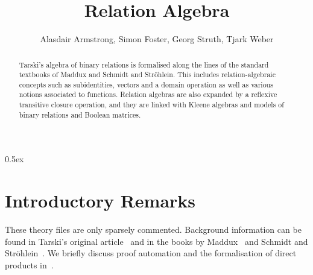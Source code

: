 \documentclass[11pt,a4paper]{article}
\begin{document}
\title{Relation Algebra}
\author{Alasdair Armstrong, Simon Foster, Georg Struth, Tjark Weber}
\maketitle

\begin{abstract}
Tarski's algebra of binary relations is formalised along the lines of
the standard textbooks of Maddux and Schmidt and Str\"ohlein. This
includes relation-algebraic concepts such as subidentities, vectors
and a domain operation as well as various notions associated to
functions. Relation algebras are also expanded by a reflexive
transitive closure operation, and they are linked with Kleene algebras
and models of binary relations and Boolean matrices.
\end{abstract}

\tableofcontents

\parindent 0pt\parskip 0.5ex

\section{Introductory Remarks}

These theory files are only sparsely commented. Background information
can be found in Tarski's original article~\cite{tarski41} and in the
books by Maddux~\cite{maddux06} and Schmidt and
Str{\"o}hlein~\cite{schmidt87}. We briefly discuss proof automation
and the formalisation of direct products in~\cite{armstrong14}.





\end{document}

